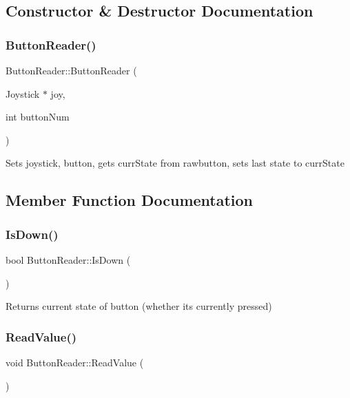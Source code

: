 \subsection{Constructor \& Destructor Documentation}
\mbox{\label{class_button_reader_a1bb75f75d6e392a748c6101e09e3bd3c}} 
\subsubsection{\texorpdfstring{Button\+Reader()}{ButtonReader()}}
{\footnotesize\ttfamily Button\+Reader\+::\+Button\+Reader (\begin{DoxyParamCaption}\item[{Joystick $\ast$}]{joy,  }\item[{int}]{button\+Num }\end{DoxyParamCaption})}

Sets joystick, button, gets curr\+State from rawbutton, sets last state to curr\+State 

\subsection{Member Function Documentation}
\mbox{\label{class_button_reader_a89a81fffd0726973811c6e791ac12a1d}} 
\subsubsection{\texorpdfstring{Is\+Down()}{IsDown()}}
{\footnotesize\ttfamily bool Button\+Reader\+::\+Is\+Down (\begin{DoxyParamCaption}{ }\end{DoxyParamCaption})}

\begin{DoxyReturn}{Returns}
current state of button (whether its currently pressed) 
\end{DoxyReturn}
\mbox{\label{class_button_reader_a4585d7ca717ea49021ac5a786c352b81}} 
\subsubsection{\texorpdfstring{Read\+Value()}{ReadValue()}}
{\footnotesize\ttfamily void Button\+Reader\+::\+Read\+Value (\begin{DoxyParamCaption}{ }\end{DoxyParamCaption})}

